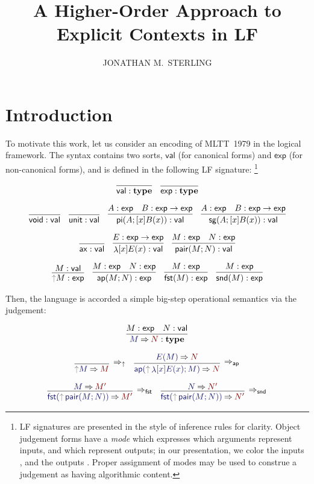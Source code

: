 \documentclass[acmtoplas]{acmtrans2m}
\title{A Higher-Order Approach to Explicit Contexts in LF}
\author{JONATHAN M.\ STERLING}
\def\InputModeColorName{MidnightBlue}
\def\OutputModeColorName{Maroon}
\newcommand\InputMode[1]{{\color{\InputModeColorName}{#1}}}
\newcommand\OutputMode[1]{{\color{\OutputModeColorName}{#1}}}
\newcommand\type{\mathbf{type}}
\newcommand\tyvoid{\mathsf{void}}
\newcommand\tyunit{\mathsf{unit}}
\newcommand\ax{\mathsf{ax}}
\newcommand\ap{\mathsf{ap}}
\newcommand\sortval{\mathsf{val}}
\newcommand\sortexp{\mathsf{exp}}
\newcommand\eval[2]{\InputMode{#1}\mathbin{\Rightarrow}\OutputMode{#2}}
\newcommand\thunk[1]{{\color{Gray}\uparrow}#1}
\newcommand\evalrule[1]{\Rightarrow_{#1}}
\DeclareMathOperator{\typi}{\mathsf{pi}}
\DeclareMathOperator{\tysg}{\mathsf{sg}}
\DeclareMathOperator{\lam}{\mathsf{\lambda}}
\DeclareMathOperator{\pair}{\mathsf{pair}}
\DeclareMathOperator{\fst}{\mathsf{fst}}
\DeclareMathOperator{\snd}{\mathsf{snd}}
\begin{document}
\maketitle

\section{Introduction}

To motivate this work, let us consider an encoding of MLTT~1979 in the logical
framework. The syntax contains two sorts, $\sortval$ (for canonical forms) and
$\sortexp$ (for non-canonical forms), and is defined in the following LF
signature: \footnote{LF signatures are presented in the style of inference
  rules for clarity. Object judgement forms have a \emph{mode} which expresses
  which arguments represent inputs, and which represent outputs; in our
  presentation, we color the inputs \emph{\InputMode\InputModeColorName}, and
  the outputs \emph{\OutputMode\OutputModeColorName}. Proper assignment of
modes may be used to construe a judgement as having algorithmic content.}

\begin{gather*}
  \infer{\sortval:\type}{}
  \quad
  \infer{\sortexp:\type}{}\\[6pt]
  \infer{\tyvoid:\sortval}{}
  \quad
  \infer{\tyunit:\sortval}{}
  \quad
  \infer{
    \typi(A;[x]B(x)):\sortval
  }{
    A:\sortexp &
    B:\sortexp\to\sortexp
  }
  \quad
  \infer{
    \tysg(A;[x]B(x)):\sortval
  }{
    A:\sortexp &
    B:\sortexp\to\sortexp
  }\\[6pt]
  \infer{\ax:\sortval}{}
  \quad
  \infer{
    \lam[x]E(x):\sortval
  }{
    E:\sortexp\to\sortexp
  }
  \quad
  \infer{
    \pair(M;N):\sortval
  }{
    M:\sortexp &
    N:\sortexp
  } \\[6pt]
  \infer{
    \thunk{M}:\sortexp
  }{
    M:\sortval
  }
  \quad
  \infer{
    \ap(M;N):\sortexp
  }{
    M:\sortexp &
    N:\sortexp
  }
  \quad
  \infer{
    \fst(M):\sortexp
  }{
    M:\sortexp
  }
  \quad
  \infer{
    \snd(M):\sortexp
  }{
    M:\sortexp
  }
\end{gather*}


Then, the language is accorded a simple big-step operational semantics via the
\framebox{$\eval{M}{N}$} judgement:

\begin{gather*}
  \infer{
    \eval{M}{N}:\type
  }{
    M:\sortexp &
    N:\sortval
  }\\[6pt]
  \infer[\evalrule\uparrow]{
    \eval{\thunk{M}}{M}
  }{
  }
  \quad
  \infer[\evalrule\ap]{
    \eval{\ap(\thunk{\lam[x]E(x)};M)}{N}
  }{
    \eval{E(M)}{N}
  }\\[6pt]
  \infer[\evalrule\fst]{
    \eval{\fst(\thunk{\pair(M;N)})}{M'}
  }{
    \eval{M}{M'}
  }
  \quad
  \infer[\evalrule\snd]{
    \eval{\fst(\thunk{\pair(M;N)})}{N'}
  }{
    \eval{N}{N'}
  }
\end{gather*}
\end{document}
